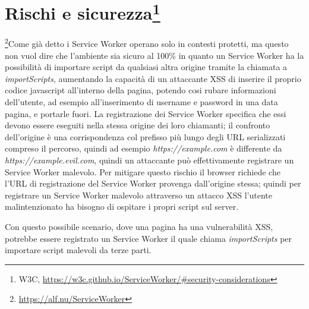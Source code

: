 \documentclass[11pt ,a4paper , twoside , openright ]{book}
\begin{document}
	\section[Rischi e sicurezza]{Rischi e sicurezza\footnote{W3C, \url{https://w3c.github.io/ServiceWorker/\#security-considerations}}}
	\footnote{\url{https://alf.nu/ServiceWorker}}Come già detto i Service Worker operano solo in contesti protetti, ma questo non vuol dire che l'ambiente sia sicuro al 100\% in quanto un Service Worker ha la possibilità di importare script da qualsiasi altra origine tramite la chiamata a \textit{importScripts}, aumentando la capacità di un attaccante XSS di inserire il proprio codice javascript all'interno della pagina, potendo cosi rubare informazioni dell'utente, ad esempio all'inserimento di username e password in una data pagina, e portarle fuori. La registrazione dei Service Worker specifica che essi devono essere eseguiti nella stessa origine dei loro chiamanti; il confronto dell'origine è una corrispondenza col prefisso più lungo degli URL serializzati compreso il percorso, quindi ad esempio \textit{https://example.com} è differente da \textit{https://example.evil.com}, quindi un attaccante può effettivamente registrare un Service Worker malevolo. Per mitigare questo rischio il browser richiede che l'URL di registrazione del Service Worker provenga dall'origine stessa; quindi per registrare un Service Worker malevolo attraverso un attacco XSS l'utente malintenzionato ha bisogno di ospitare i propri script sul server.
	\\

	Con questo possibile scenario, dove una pagina ha una vulnerabilità XSS, potrebbe essere registrato un Service Worker il quale chiama \textit{importScripts} per importare script malevoli da terze parti.
\end{document}
